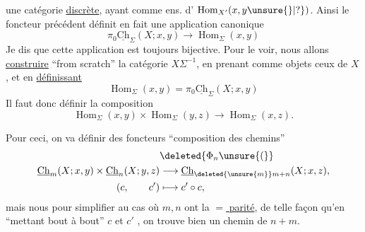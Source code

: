 une catégorie \uline{discrète}, ayant comme ens. d' $\operatorname{Hom}_{X'}(x,y\unsure{\}|?})$. Ainsi le foncteur précédent définit en fait une application canonique
\[
\boxed{\pi_0\underline{\mathrm{Ch}}_\Sigma(X;x,y)\longrightarrow\operatorname{Hom}_\Sigma(x,y)}
\]
Je dis que cette application est toujours bijective. Pour le voir, nous allons \uline{construire} ``from scratch'' la catégorie $X\Sigma^{-1}$, en prenant comme objets ceux de $X$, et  en \uline{définissant}
\[
\boxed{\operatorname{Hom}_\Sigma(x,y)=\pi_0\underline{\mathrm{Ch}}_\Sigma(X;x,y)}
\]
Il faut donc définir la composition
\[
\operatorname{Hom}_\Sigma(x,y)\times\operatorname{Hom}_\Sigma(y,z)\longrightarrow\operatorname{Hom}_\Sigma(x,z).
\]

Pour ceci, on va définir des foncteurs ``composition des chemins''
\[
\begin{aligned}
&\deleted{\Phi_n\unsure{(}}\\
\underline{\mathrm{Ch}}_m(X;x,y)\times\underline{\mathrm{Ch}}_n(X;y,z)&\longrightarrow\underline{\mathrm{Ch}}_{\deleted{\unsure{m}}m+n}(X;x,z),\\
(c,\qquad c')&\longmapsto c'\circ c,
\end{aligned}
\]
mais  nous  pour simplifier au cas où $m,n$ ont la \uline{$=$ parité}, de telle façon qu'en ``mettant bout à bout'' $c$ et $c'$ , on trouve bien un chemin de  $n+m$.


